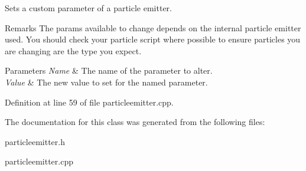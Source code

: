 Sets a custom parameter of a particle emitter. 

\begin{DoxyRemark}{Remarks}
The params available to change depends on the internal particle emitter used. You should check your particle script where possible to ensure particles you are changing are the type you expect. 
\end{DoxyRemark}

\begin{DoxyParams}{Parameters}
{\em Name} & The name of the parameter to alter. \\
\hline
{\em Value} & The new value to set for the named parameter. \\
\hline
\end{DoxyParams}


Definition at line 59 of file particleemitter.cpp.



The documentation for this class was generated from the following files:\begin{DoxyCompactItemize}
\item 
particleemitter.h\item 
particleemitter.cpp\end{DoxyCompactItemize}
